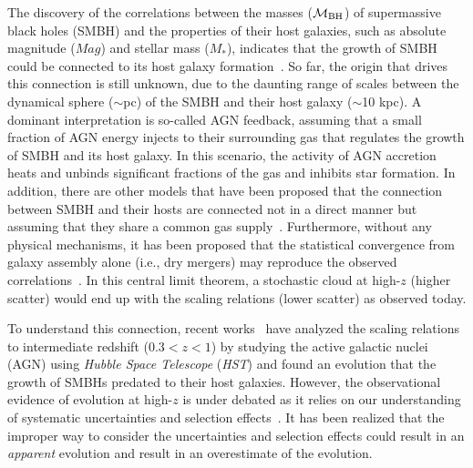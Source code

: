 \documentclass{natureprintstyle}
\newcommand{\mbh}{$\mathcal M_{\rm BH}$}
\newcommand{\mstar}{{$M_*$}}
\begin{document}
The discovery of the correlations between the masses (\mbh) of supermassive black holes (SMBH) and the properties of their host galaxies, such as absolute magnitude ($Mag$) and stellar mass (\mstar), indicates that the growth of SMBH could be connected to its host galaxy formation~\cite{Mag++98, F+M00, M+H03, H+R04, Gul++09}. So far, the origin that drives this connection is still unknown, due to the daunting range of scales between the dynamical sphere ($\sim$pc) of the SMBH and their host galaxy ($\sim$10 kpc). A dominant interpretation is so-called AGN feedback, assuming that a small fraction of AGN energy injects to their surrounding gas that regulates the growth of SMBH and its host galaxy. In this scenario, the activity of AGN accretion heats and unbinds significant fractions of the gas and inhibits star formation. In addition, there are other models that have been proposed that the connection between SMBH and their hosts are connected not in a direct manner but assuming that they share a common gas supply~\cite{Cen2015, Menci2016}. Furthermore, without any physical mechanisms, it has been proposed that the statistical convergence from galaxy assembly alone (i.e., dry mergers) may reproduce the observed correlations~\cite{Peng2007, Jahnke2011, Hirschmann2010}. In this central limit theorem, a stochastic cloud at high-$z$ (higher scatter) would end up with the scaling relations (lower scatter) as observed today.

To understand this connection, recent works~\cite{Park15, Tre++07, Bennert11, Woo++08} have analyzed the scaling relations to intermediate redshift {($0.3<z<1$)} by studying the active galactic nuclei (AGN) using {\it Hubble Space Telescope} ({\it HST}) and found an evolution that the growth of SMBHs predated to their host galaxies. However, the observational evidence of evolution at high-$z$ is under debated as it relies on our understanding of systematic uncertainties and selection effects~\cite{Lauer2007}. It has been realized that the improper way to consider the uncertainties and selection effects could result in an {\it apparent} evolution and result in an overestimate of the evolution\cite{Volonteri2011}.
\end{document}
